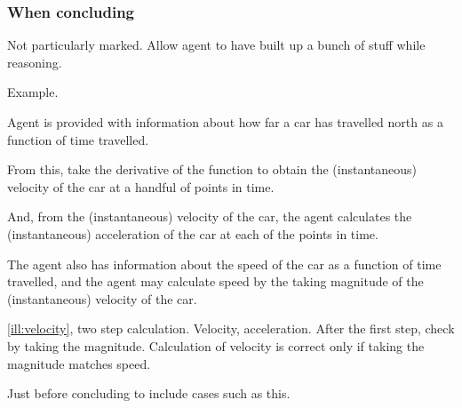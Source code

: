 \subsubsection{When concluding}

\begin{note}
  Not particularly marked.
  Allow agent to have built up a bunch of stuff while reasoning.

  Example.

  \begin{scenario}[Velocity]
    \label{ill:velocity}
    Agent is provided with information about how far a car has travelled north as a function of time travelled.

    From this, take the derivative of the function to obtain the (instantaneous) velocity of the car at a handful of points in time.

    And, from the (instantaneous) velocity of the car, the agent calculates the (instantaneous) acceleration of the car at each of the points in time.

    The agent also has information about the speed of the car as a function of time travelled, and the agent may calculate speed by the taking magnitude of the (instantaneous) velocity of the car.
  \end{scenario}

  \autoref{ill:velocity}, two step calculation.
  Velocity, acceleration.
  After the first step, check by taking the magnitude.
  Calculation of velocity is correct only if taking the magnitude matches speed.

  Just before concluding to include cases such as this.
\end{note}

